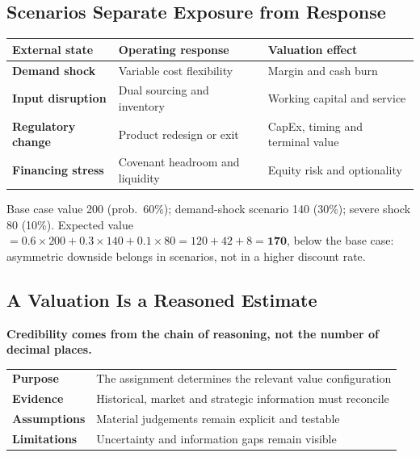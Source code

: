 \subsection{Scenarios Separate Exposure from Response}
\begin{center}
\small
\begin{tabular}{@{}>{\bfseries}l ll@{}}
\toprule
\textnormal{\textbf{External state}} & \textbf{Operating response} & \textbf{Valuation effect}\\
\midrule
Demand shock & Variable cost flexibility & Margin and cash burn\\
Input disruption & Dual sourcing and inventory & Working capital and service\\
Regulatory change & Product redesign or exit & CapEx, timing and terminal value\\
Financing stress & Covenant headroom and liquidity & Equity risk and optionality\\
\bottomrule
\end{tabular}
\end{center}
\begin{exbox}
Base case value 200 (prob.\ 60\%); demand-shock scenario 140 (30\%); severe shock 80 (10\%). Expected value $=0.6\times200+0.3\times140+0.1\times80=120+42+8=\mathbf{170}$, below the base case: asymmetric downside belongs in scenarios, not in a higher discount rate.
\end{exbox}

\subsection{A Valuation Is a Reasoned Estimate}
\begin{keybox}
\textbf{Credibility comes from the chain of reasoning, not the number of decimal places.}
\end{keybox}
\begin{center}
\small
\begin{tabular}{@{}>{\bfseries}l p{11cm}@{}}
Purpose & The assignment determines the relevant value configuration\\
Evidence & Historical, market and strategic information must reconcile\\
Assumptions & Material judgements remain explicit and testable\\
Limitations & Uncertainty and information gaps remain visible\\
\end{tabular}
\end{center}

